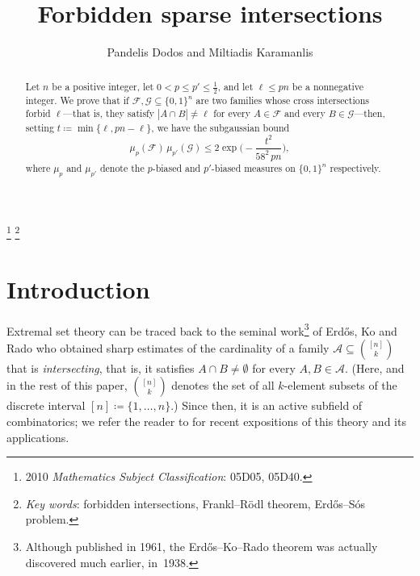 \documentclass[10pt]{amsart}
\theoremstyle{remark}
\begin{document}
\title[Forbidden sparse intersections]{Forbidden sparse intersections}

\author{Pandelis Dodos and Miltiadis Karamanlis}

\address{Department of Mathematics, University of Athens, Panepistimiopolis 157 84, Athens, Greece}

\address{Department of Mathematics, University of Athens, Panepistimiopolis 157 84, Athens, Greece}

\thanks{2010 \textit{Mathematics Subject Classification}: 05D05, 05D40.}
\thanks{\textit{Key words}: forbidden intersections, Frankl--R\"{o}dl theorem, Erd\H{os}--S\'{o}s problem.}


\begin{abstract}
Let $n$ be a positive integer, let $0<p\leqslant p'\leqslant \frac12$, and let $\ell\leqslant pn$ be a nonnegative integer.
We prove that if $\mathcal{F},\mathcal{G}\subseteq \{0,1\}^n$ are two families whose cross intersections forbid
$\ell$---that is, they satisfy $|A\cap B|\neq \ell$ for every $A\in\mathcal{F}$ and every $B\in\mathcal{G}$---then,
setting $t\coloneqq \min\{\ell,pn-\ell\}$, we have the subgaussian bound
\[ \mu_p(\mathcal{F})\, \mu_{p'}(\mathcal{G}) \leqslant 2\exp\Big( - \frac{t^2}{58^2\,pn}\Big), \]
where $\mu_p$ and $\mu_{p'}$ denote the $p$-biased and $p'$-biased measures on $\{0,1\}^n$ respectively.
\end{abstract}

\maketitle

\tableofcontents


\section{Introduction} \label{sec1}


Extremal set theory can be traced back to the seminal work\footnote{Although published in 1961,
the Erd\H{o}s--Ko--Rado theorem was actually discovered much earlier, in~1938.} of Erd\H{o}s, Ko and
Rado \cite{EKR61} who obtained sharp estimates of the cardinality of a family $\mathcal{A}\subseteq \binom{[n]}{k}$
that is \textit{intersecting}, that is, it satisfies $A\cap B\neq \emptyset$ for every $A,B\in\mathcal{A}$.
(Here, and in the rest of this paper, $\binom{[n]}{k}$ denotes the set of all $k$-element subsets of
the discrete interval $[n]\coloneqq \{1,\dots,n\}$.) Since then, it is an active subfield of combinatorics;
we refer the reader to \cite{El22,FT18} for recent expositions of this theory and its applications.
\end{document}
